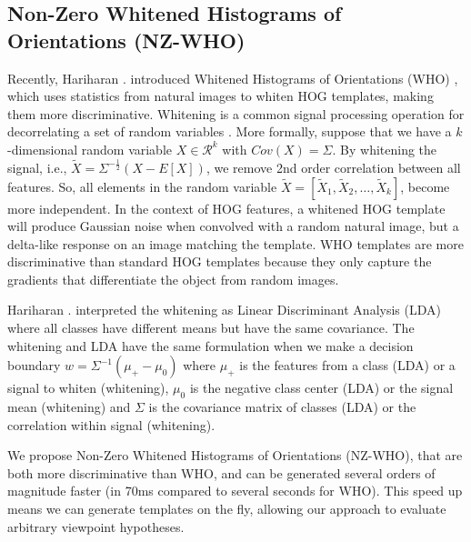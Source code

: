 \documentclass[10pt,twocolumn,letterpaper]{article}
\newcommand{\scream}[1]{{\color{red} \bf *** #1 ***}}
\begin{document}
\subsection{Non-Zero Whitened Histograms of Orientations (NZ-WHO)}

Recently, Hariharan \etal. introduced Whitened Histograms of Orientations (WHO)
\cite{Hariharan12}, which uses statistics from natural images to whiten HOG
templates, making them more discriminative. Whitening is a common signal
processing operation for decorrelating a set of random variables
\cite{Martinsson05, Belouchrani00}. More formally, suppose that we have a
$k$-dimensional random variable $X \in \mathcal{R}^k$ with $Cov(X)=\Sigma$. By
whitening the signal, i.e., $\tilde{X}=\Sigma^{-\frac{1}{2}}(X - E[X])$, we
remove 2nd order correlation between all features. So, all elements in the
random variable $\tilde{X} = \left[\tilde{X}_1, \tilde{X}_2, \dots,
\tilde{X}_k\right]$, become more independent. In the context of HOG features, a
whitened HOG template will produce Gaussian noise when convolved with a random
natural image, but a delta-like response on an image matching the template. WHO
templates are more discriminative than standard HOG templates because they only
capture the gradients that differentiate the object from random images.

Hariharan \etal. interpreted the
whitening as Linear Discriminant Analysis (LDA) where all classes have different
means but have the same covariance. The whitening and LDA have the same
formulation when we make a decision boundary $w = \Sigma^{-1}(\mu_+ - \mu_0)$
where $\mu_+$ is the features from a class (LDA) or a signal to whiten
(whitening), $\mu_0$ is the negative class center (LDA) or the signal mean
(whitening) and $\Sigma$ is the covariance matrix of classes (LDA) or
the correlation within signal (whitening).

We propose Non-Zero Whitened Histograms of Orientations (NZ-WHO), that are both
more discriminative than WHO, and can be generated several orders of magnitude
faster (in 70ms compared to several seconds for WHO). This speed up means we
can generate templates on the fly, allowing our approach to evaluate arbitrary
viewpoint hypotheses. 
\end{document}
